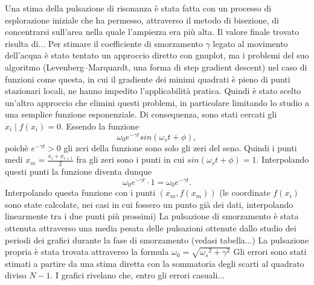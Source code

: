 Una stima della pulsazione di risonanza è stata fatta con un processo di esplorazione iniziale che ha permesso, attraverso
il metodo di bisezione, di concentrarsi sull'area nella quale l'ampiezza era più alta. Il valore finale trovato risulta di...
Per stimare il coefficiente di smorzamento $\gamma$ legato al movimento dell'acqua è stato tentato un approccio diretto con gnuplot, ma i problemi del suo algoritmo 
(Levenberg–Marquardt, una forma di step gradient descent) nel caso di funzioni come questa, in cui il gradiente dei minimi quadrati è pieno di punti 
stazionari locali, ne hanno impedito l'applicabilità pratica. Quindi è stato scelto un'altro approccio che elimini questi problemi, in particolare limitando lo
studio a una semplice funzione esponenziale.
Di consequenza, sono stati cercati gli $x_i \mid f(x_i)=0$. Essendo la funzione
\begin{equation}
	\omega_0 e^{-\gamma t} sin(\omega_s t + \phi),
\end{equation}
poichè $e^{-\gamma t} > 0$ gli zeri della funzione sono solo gli zeri del seno. Quindi i punti medi $x_m = \frac{x_i + x_{i+1}}{2}$ fra gli zeri sono i punti in cui $sin(\omega_s t + \phi) = 1$.
Interpolando questi punti la funzione diventa dunque
\[
	\omega_0 e^{-\gamma t} \cdot 1 = \omega_0 e^{-\gamma t}.
\]
Interpolando questa funzione con i punti $(x_m,f(x_m))$ (le coordinate $f(x_i)$ sono state calcolate, nei casi in cui fossero un punto già dei dati,
interpolando linearmente tra i due punti più prossimi)
La pulsazione di smorzamento è stata ottenuta attraverso una media pesata delle pulsazioni ottenute dallo studio dei periodi dei
grafici durante la fase di smorzamento (vedasi tabella...)
La pulsazione propria è stata trovata attraverso la formula $\omega_0 =\sqrt{{\omega_s} ^ 2 + \gamma ^ 2 }$
Gli errori sono stati stimati a partire da una stima diretta con la sommatoria degli scarti al quadrato diviso $N-1$.
I grafici rivelano che, entro gli errori casuali...

